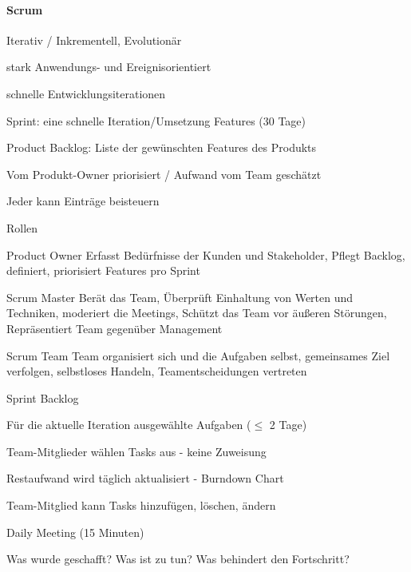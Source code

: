 \documentclass[a4paper]{article}
\begin{document}
\begin{multicols}{3}
  \paragraph{Scrum}
  \begin{itemize*}
    \item Iterativ / Inkrementell, Evolutionär
    \item stark Anwendungs- und Ereignisorientiert
    \item schnelle Entwicklungsiterationen
    \item Sprint: eine schnelle Iteration/Umsetzung Features (30 Tage)
    \item Product Backlog: Liste der gewünschten Features des Produkts
    \begin{itemize*}
      \item Vom Produkt-Owner priorisiert / Aufwand vom Team geschätzt
      \item Jeder kann Einträge beisteuern
    \end{itemize*}
    \item Rollen
    \begin{description*}
      \item[Product Owner] Erfasst Bedürfnisse der Kunden und Stakeholder, Pflegt Backlog, definiert, priorisiert Features pro Sprint
      \item[Scrum Master] Berät das Team, Überprüft Einhaltung von Werten und Techniken, moderiert die Meetings, Schützt das Team vor äußeren Störungen, Repräsentiert Team gegenüber Management
      \item[Scrum Team] Team organisiert sich und die Aufgaben selbst, gemeinsames Ziel verfolgen, selbstloses Handeln, Teamentscheidungen vertreten
    \end{description*}
    \item Sprint Backlog
    \begin{itemize*}
      \item Für die aktuelle Iteration ausgewählte Aufgaben ($\leq$ 2 Tage)
      \item Team-Mitglieder wählen Tasks aus - keine Zuweisung
      \item Restaufwand wird täglich aktualisiert - Burndown Chart
      \item Team-Mitglied kann Tasks hinzufügen, löschen, ändern
    \end{itemize*}
    \item Daily Meeting (15 Minuten)
    \begin{itemize*}
      \item Was wurde geschafft? Was ist zu tun? Was behindert den Fortschritt?

\end{itemize*}
\end{itemize*}
\end{multicols}
\end{document}
